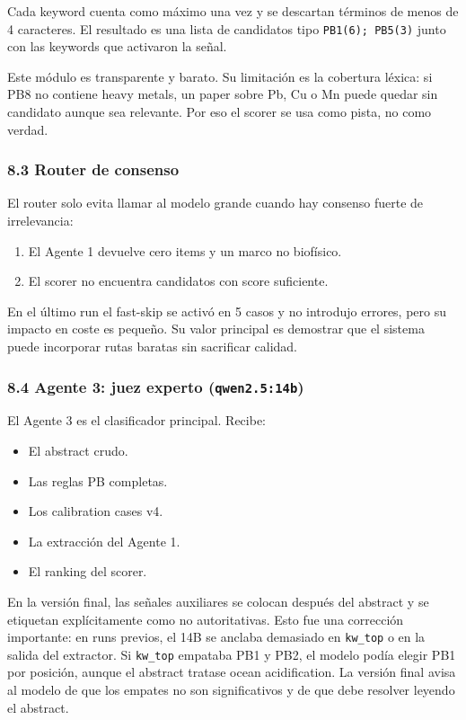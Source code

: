 Cada keyword cuenta como máximo una vez y se descartan términos de menos de 4 caracteres. El resultado es una lista de candidatos tipo \texttt{PB1(6); PB5(3)} junto con las keywords que activaron la señal.

Este módulo es transparente y barato. Su limitación es la cobertura léxica: si PB8 no contiene heavy metals, un paper sobre Pb, Cu o Mn puede quedar sin candidato aunque sea relevante. Por eso el scorer se usa como pista, no como verdad.

\subsubsection{8.3 Router de consenso}

El router solo evita llamar al modelo grande cuando hay consenso fuerte de irrelevancia:

\begin{enumerate}
\item El Agente 1 devuelve cero items y un marco no biofísico.
\item El scorer no encuentra candidatos con score suficiente.
\end{enumerate}

En el último run el fast-skip se activó en 5 casos y no introdujo errores, pero su impacto en coste es pequeño. Su valor principal es demostrar que el sistema puede incorporar rutas baratas sin sacrificar calidad.

\subsubsection{8.4 Agente 3: juez experto (\texttt{qwen2.5:14b})}

El Agente 3 es el clasificador principal. Recibe:

\begin{itemize}
\item El abstract crudo.
\item Las reglas PB completas.
\item Los calibration cases v4.
\item La extracción del Agente 1.
\item El ranking del scorer.
\end{itemize}

En la versión final, las señales auxiliares se colocan después del abstract y se etiquetan explícitamente como no autoritativas. Esto fue una corrección importante: en runs previos, el 14B se anclaba demasiado en \texttt{kw\_top} o en la salida del extractor. Si \texttt{kw\_top} empataba PB1 y PB2, el modelo podía elegir PB1 por posición, aunque el abstract tratase ocean acidification. La versión final avisa al modelo de que los empates no son significativos y de que debe resolver leyendo el abstract.

